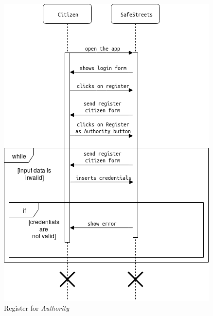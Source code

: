 \documentclass{article}
\begin{document}
\begin{figure}[H]
    \centering
    \includegraphics[scale=0.5]{img/sequence_diagrams/register_authority.png}
    \caption{Register for \textit{Authority}}
\end{figure}
\end{document}
